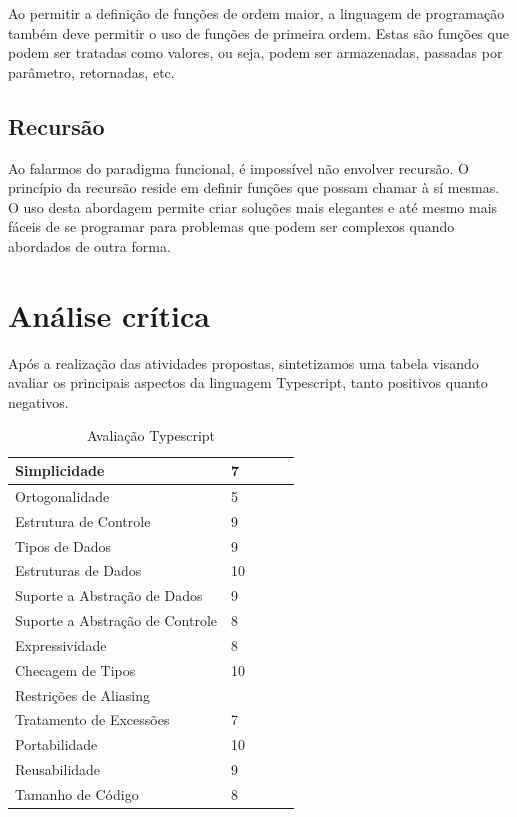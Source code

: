 \documentclass[rel_mlp]{iiufrgs}
\numberwithin{figure}{chapter}
\begin{document}
Ao permitir a definição de funções de ordem maior, a linguagem de programação também deve permitir o uso de funções de primeira ordem. Estas são funções que podem ser tratadas como valores, ou seja, podem ser armazenadas, passadas por parâmetro, retornadas, etc.


\section{Recursão}

Ao falarmos do paradigma funcional, é impossível não envolver recursão. O princípio da recursão reside em definir funções que possam chamar à sí mesmas. O uso desta abordagem permite criar soluções mais elegantes e até mesmo mais fáceis de se programar para problemas que podem ser complexos quando abordados de outra forma.


%
\chapter{Análise crítica}

Após a realização das atividades propostas, sintetizamos uma tabela visando avaliar os principais aspectos da linguagem Typescript, tanto positivos quanto negativos.

\begin{table}[h]
\centering
\caption{Avaliação Typescript}
\label{aval}
\begin{tabular}{|l|l|l|l|l|}
\hline
Simplicidade          			&  7  \\ \hline
Ortogonalidade        			&  5  \\ \hline
Estrutura de Controle 			&  9  \\ \hline
Tipos de Dados        			&  9  \\ \hline
Estruturas de Dados   			&  10 \\ \hline
Suporte a Abstração de Dados    &  9  \\ \hline
Suporte a Abstração de Controle	&  8  \\ \hline
Expressividade        			&  8  \\ \hline
Checagem de Tipos     			&  10 \\ \hline
Restrições de Aliasing        	&  	  \\ \hline
Tratamento de Excessões 		&  7  \\ \hline
Portabilidade        			&  10 \\ \hline
Reusabilidade          			&  9  \\ \hline
Tamanho de Código        		&  8  \\ \hline
\end{tabular}
\end{table}
\end{document}
